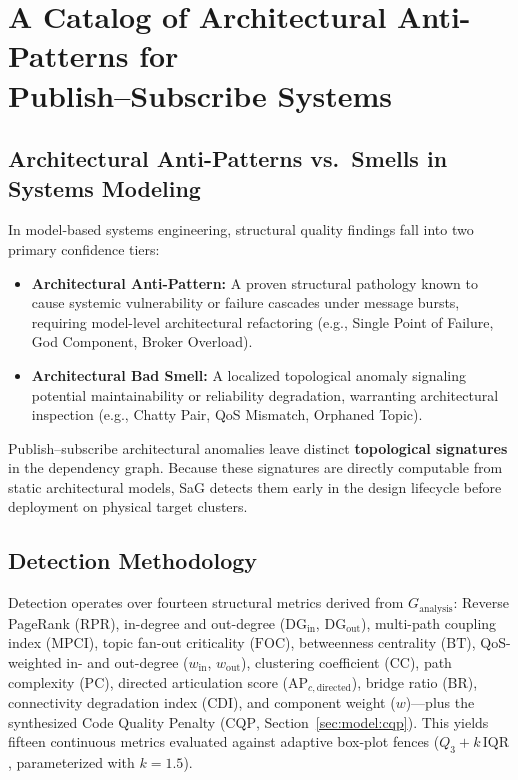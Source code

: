 \section[Architectural Anti-Pattern Catalog for Publish--Subscribe Systems]{A Catalog of Architectural Anti-Patterns for\\ Publish--Subscribe Systems}
\label{sec:antipattern_catalog}

\subsection{Architectural Anti-Patterns vs.\ Smells in Systems Modeling}
\label{sec:catalog:taxonomy}

In model-based systems engineering, structural quality findings fall into two primary confidence tiers:
\begin{itemize}
    \item \textbf{Architectural Anti-Pattern:} A proven structural pathology known to cause systemic vulnerability or failure cascades under message bursts, requiring model-level architectural refactoring (e.g., Single Point of Failure, God Component, Broker Overload).
    \item \textbf{Architectural Bad Smell:} A localized topological anomaly signaling potential maintainability or reliability degradation, warranting architectural inspection (e.g., Chatty Pair, QoS Mismatch, Orphaned Topic).
\end{itemize}

Publish--subscribe architectural anomalies leave distinct \textbf{topological signatures} in the dependency graph. Because these signatures are directly computable from static architectural models, SaG detects them early in the design lifecycle before deployment on physical target clusters.

\subsection{Detection Methodology}
\label{sec:catalog:methodology}

Detection operates over fourteen structural metrics derived from $G_{\text{analysis}}$: Reverse PageRank ($\mathrm{RPR}$), in-degree and out-degree ($\mathrm{DG}_{\text{in}}$, $\mathrm{DG}_{\text{out}}$), multi-path coupling index ($\mathrm{MPCI}$), topic fan-out criticality ($\mathrm{FOC}$), betweenness centrality ($\mathrm{BT}$), QoS-weighted in- and out-degree ($w_{\text{in}}$, $w_{\text{out}}$), clustering coefficient ($\mathrm{CC}$), path complexity ($\mathrm{PC}$), directed articulation score ($\mathrm{AP}_{c,\text{directed}}$), bridge ratio ($\mathrm{BR}$), connectivity degradation index ($\mathrm{CDI}$), and component weight ($w$)---plus the synthesized Code Quality Penalty ($\mathrm{CQP}$, Section~\ref{sec:model:cqp}). This yields fifteen continuous metrics evaluated against adaptive box-plot fences ($Q_3 + k\,\mathrm{IQR}$, parameterized with $k=1.5$).

